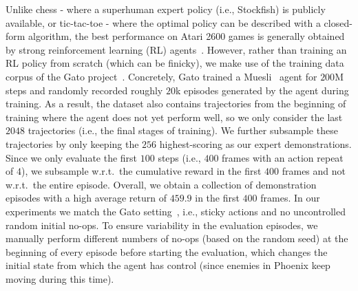 \documentclass{article}
\newcommand{\ie}{i.e., }
\newcommand{\wrt}{w.r.t.\ }
\begin{document}
Unlike chess - where a superhuman expert policy (\ie Stockfish) is publicly available, or tic-tac-toe - where the optimal policy can be described with a closed-form algorithm, the best performance on Atari 2600 games is generally obtained by strong reinforcement learning (RL) agents~\citep{mnih2013playing, hessel2021muesli}.
However, rather than training an RL policy from scratch (which can be finicky), we make use of the training data corpus of the Gato project~\citep{reed2022generalist}.
Concretely, Gato trained a Muesli~\citep{hessel2021muesli} agent for $200$M steps and randomly recorded roughly $20$k episodes generated by the agent during training.
As a result, the dataset also contains trajectories from the beginning of training where the agent does not yet perform well, so we only consider the last $2048$ trajectories (\ie the final stages of training).
We further subsample these trajectories by only keeping the $256$ highest-scoring as our expert demonstrations.
Since we only evaluate the first $100$ steps (\ie $400$ frames with an action repeat of $4$), we subsample \wrt the cumulative reward in the first $400$ frames and not \wrt the entire episode.
Overall, we obtain a collection of demonstration episodes with a high average return of $459.9$ in the first $400$ frames. In our experiments we match the Gato setting~\citep{reed2022generalist}, \ie sticky actions and no uncontrolled random initial no-ops. To ensure variability in the evaluation episodes, we manually perform different numbers of no-ops (based on the random seed) at the beginning of every episode before starting the evaluation, which changes the initial state from which the agent has control (since enemies in Phoenix keep moving during this time).
\end{document}
